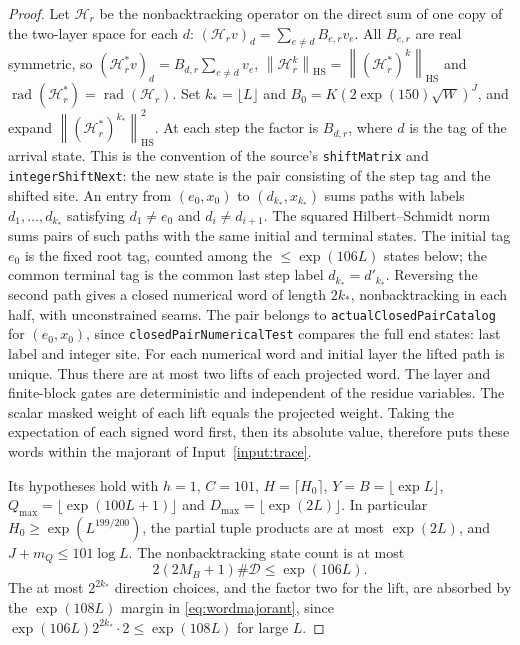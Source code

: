 \documentclass[11pt]{article}
\theoremstyle{definition}
\newcommand{\leanname}[1]{\nolinkurl{#1}}
\newcommand{\norm}[1]{\left\lVert#1\right\rVert}
\DeclareMathOperator{\rad}{rad}
\DeclareMathOperator{\HS}{HS}
\begin{document}
\begin{proof}
Let $\mathcal H_r$ be the nonbacktracking operator on the direct sum of
one copy of the two-layer space for each $d$:
$(\mathcal H_r v)_d=\sum_{e\ne d}B_{e,r}v_e$.
All $B_{e,r}$ are real symmetric, so
$(\mathcal H_r^*v)_d=B_{d,r}\sum_{e\ne d}v_e$,
$\norm{\mathcal H_r^k}_{\HS}=\norm{(\mathcal H_r^*)^k}_{\HS}$ and
$\rad(\mathcal H_r^*)=\rad(\mathcal H_r)$.
Set $k_*=\lfloor L\rfloor$ and $B_0=K(2\exp(150)\sqrt W)^J$,
and expand $\norm{(\mathcal H_r^*)^{k_*}}_{\HS}^2$.
At each step the factor is $B_{d,r}$, where $d$ is the tag of the
arrival state. This is the convention of the source's
\leanname{shiftMatrix} and \leanname{integerShiftNext}: the new state
is the pair consisting of the step tag and the shifted site.
An entry from $(e_0,x_0)$ to $(d_{k_*},x_{k_*})$ sums paths with labels
$d_1,\ldots,d_{k_*}$ satisfying $d_1\ne e_0$ and
$d_i\ne d_{i+1}$. The squared Hilbert--Schmidt norm sums pairs of
such paths with the same initial and terminal states.
The initial tag $e_0$ is the fixed root tag, counted among the
$\le\exp(106L)$ states below; the common terminal tag is the common
last step label $d_{k_*}=d'_{k_*}$.
Reversing the second path gives a closed numerical word of length
$2k_*$, nonbacktracking in each half, with unconstrained seams.
The pair belongs to \leanname{actualClosedPairCatalog} for
$(e_0,x_0)$, since \leanname{closedPairNumericalTest} compares the
full end states: last label and integer site.
For each numerical word and initial layer the lifted path is unique.
Thus there are at most two lifts of each projected word.
The layer and finite-block gates are deterministic and independent of
the residue variables. The scalar masked weight of each lift equals the
projected weight. Taking the expectation of each signed word first, then
its absolute value, therefore puts these words within the majorant of
Input~\ref{input:trace}.

Its hypotheses hold with $h=1$, $C=101$,
$H=\lceil H_0\rceil$, $Y=B=\lfloor\exp L\rfloor$,
$Q_{\max}=\lfloor\exp(100L+1)\rfloor$ and
$D_{\max}=\lfloor\exp(2L)\rfloor$.
In particular $H_0\ge\exp(L^{199/200})$, the partial tuple products
are at most $\exp(2L)$, and $J+m_Q\le101\log L$.
The nonbacktracking state count is at most
\[
 2(2M_B+1)\#\mathcal D\le\exp(106L).
\]
The at most $2^{2k_*}$ direction choices, and the factor two for the
lift, are absorbed by the $\exp(108L)$ margin in
\eqref{eq:wordmajorant}, since
$\exp(106L)2^{2k_*}\cdot2\le\exp(108L)$ for large $L$.


\end{proof}
\end{document}
